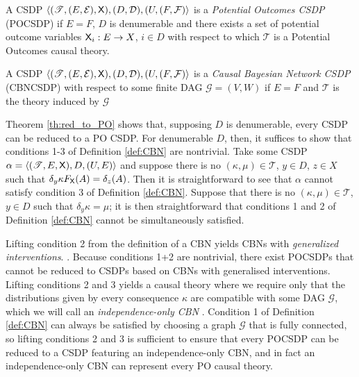 \begin{definition}
A CSDP $\langle (\mathscr{T},(E,\mathcal{E}),\mathsf{X}),(D,\mathcal{D}), (U,(F,\mathcal{F})\rangle$ is a \emph{Potential Outcomes CSDP} (POCSDP) if $E=F$, $D$ is denumerable and there exists a set of potential outcome variables $\mathsf{X}_i:E\to X$, $i\in D$ with respect to which $\mathscr{T}$ is a Potential Outcomes causal theory.
\end{definition}


\begin{definition}
A CSDP $\langle (\mathscr{T},(E,\mathcal{E}),\mathsf{X}),(D,\mathcal{D}), (U,(F,\mathcal{F})\rangle$ is a \emph{Causal Bayesian Network CSDP} (CBNCSDP) with respect to some finite DAG $\mathcal{G}=(V,W)$ if $E=F$ and $\mathscr{T}$ is the theory induced by $\mathcal{G}$ 

Theorem \ref{th:red_to_PO} shows that, supposing $D$ is denumerable, every CSDP can be reduced to a PO CSDP. For denumerable $D$, then, it suffices to show that conditions 1-3 of Definition \ref{def:CBN} are nontrivial. Take some CSDP $\alpha=\langle (\mathscr{T},E,\mathsf{X}),D,(U,E) \rangle$ and suppose there is no $(\kappa,\mu)\in \mathscr{T}$, $y\in D$, $z\in X$ such that $\delta_y\kappa F_{\mathsf{X}} (A) = \delta_{z} (A)$. Then it is straightforward to see that $\alpha$ cannot satisfy condition 3 of Definition \ref{def:CBN}. Suppose that there is no $(\kappa,\mu)\in \mathscr{T}$, $y\in D$ such that $\delta_y \kappa = \mu$; it is then straightforward that conditions 1 and 2 of Definition \ref{def:CBN} cannot be simultaneously satisfied.  

Lifting condition 2 from the definition of a CBN yields CBNs with \emph{generalized interventions}. . Because conditions 1+2 are nontrivial, there exist POCSDPs that cannot be reduced to CSDPs based on CBNs with generalised interventions. Lifting conditions 2 and 3 yields a causal theory where we require only that the distributions given by every consequence $\kappa$ are compatible with some DAG $\mathcal{G}$, which we will call an \emph{independence-only CBN} . Condition 1 of Definition \ref{def:CBN} can always be satisfied by choosing a graph $\mathcal{G}$ that is fully connected, so lifting conditions 2 and 3 is sufficient to ensure that every POCSDP can be reduced to a CSDP featuring an independence-only CBN, and in fact an independence-only CBN can represent every PO causal theory. 


\end{definition}
